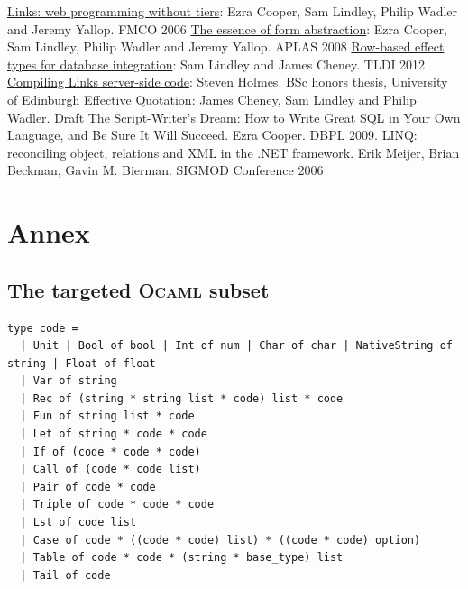 \documentclass[11pt]{article}
\newcommand\mysc[1]{{\rmfamily\textsc{#1}}\xspace}
\newcommand\ocaml{\mysc{Ocaml}}
\begin{document}
\begin{thebibliography}{99}
 \href{http://groups.inf.ed.ac.uk/links/papers/links-fmco06.pdf}{Links: web programming without tiers}: Ezra Cooper, Sam Lindley, Philip Wadler and Jeremy Yallop. FMCO 2006
 \href{http://groups.inf.ed.ac.uk/links/papers/formlets-essence.pdf}{The essence of form abstraction}: Ezra Cooper, Sam Lindley, Philip Wadler and Jeremy Yallop. APLAS 2008
 \href{http://homepages.inf.ed.ac.uk/slindley/papers/corelinks.pdf}{Row-based effect types for database integration}: Sam Lindley and James Cheney. TLDI 2012
 \href{http://groups.inf.ed.ac.uk/links/papers/undergrads/steven.pdf}{Compiling Links server-side code}: Steven Holmes. BSc honors thesis, University of Edinburgh
 Effective Quotation: James Cheney, Sam Lindley and Philip Wadler. Draft
 The Script-Writer's Dream: How to Write Great SQL 
in Your Own Language, and Be Sure It Will Succeed. Ezra Cooper. DBPL 2009.
 LINQ: reconciling object, relations and XML in the .NET framework. Erik Meijer, Brian Beckman, Gavin M. Bierman. SIGMOD Conference 2006
\end{thebibliography}

\section*{Annex}

\subsection*{The targeted \ocaml subset\label{ocamlsubset}}
\begin{lstlisting}[language={[Objective]Caml}]
type code =
  | Unit | Bool of bool | Int of num | Char of char | NativeString of string | Float of float
  | Var of string
  | Rec of (string * string list * code) list * code
  | Fun of string list * code 
  | Let of string * code * code
  | If of (code * code * code)
  | Call of (code * code list)
  | Pair of code * code
  | Triple of code * code * code
  | Lst of code list
  | Case of code * ((code * code) list) * ((code * code) option)
  | Table of code * code * (string * base_type) list
  | Tail of code
\end{lstlisting}
\end{document}
